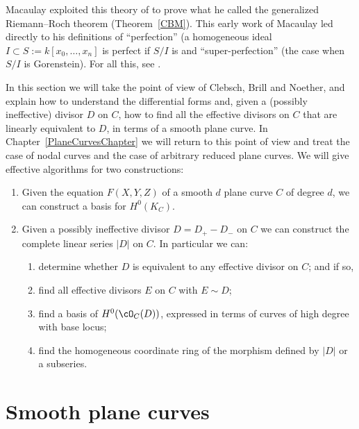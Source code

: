 Macaulay exploited this theory of 
%
to prove what he called
the generalized Riemann--Roch theorem
%
%
(Theorem~\ref{CBM}). This
early work of Mac\-aulay led directly to his definitions of
%
``perfection'' (a homogeneous ideal 
$I  \subset S:= k[x_0, \dots, x_n]$ is perfect if $S/I$ is 
%
and ``super-perfection'' (the case when $S/I$ is
%
%
Gorenstein). For all this, see \cite{eisenbud-gray}.

In this section we will take the point of view of Clebsch, Brill and Noether, and explain how to understand 
the differential forms and, given a (possibly ineffective) divisor $D$ on $C$, how to find all the 
effective divisors on $C$ that are linearly equivalent to $D$, in terms of a smooth plane curve. In Chapter~\ref{PlaneCurvesChapter} we will return to this point of view and treat the case of
nodal curves and the case of arbitrary reduced plane curves. We will give effective algorithms for
two constructions:

\begin{enumerate}
\item Given the equation $F(X,Y,Z)$ of a smooth $d$ plane curve $C$
of degree $d$, we can
construct a basis for $H^0(K_C)$. 

\item  Given a possibly ineffective divisor $D = D_{+}-D_{-}$ on $C$ we can construct the complete linear series $|D|$ on $C$. In particular we can:
\begin{enumerate}
\item determine whether $D$ is equivalent to any effective divisor on $C$; and if so,
 \item find all effective divisors $E$ on $C$ with $E \sim D$;
 \item find a basis of $H^0(\cO_C(D))$, expressed in terms of curves of high degree with  
%
base locus;
 \item find the homogeneous coordinate ring of the morphism defined by $|D|$ or a subseries.
\end{enumerate}
\end{enumerate}

\section{Smooth plane curves}\label{smooth plane curves}

